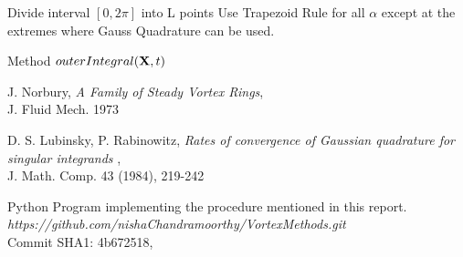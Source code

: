 \documentclass[10pt,a4paper,final]{report}
\begin{document}
\begin{algorithm}
\DontPrintSemicolon
\LinesNumbered
{}
Divide interval $[0,2\pi]$ into L points \;
Use Trapezoid Rule for all $\alpha$ except at the extremes where Gauss Quadrature can be used. \;

\caption{Method $outerIntegral({\bf X},t)$}
\end{algorithm}



\begin{thebibliography}{9}

 J. Norbury,
\emph{A Family of Steady Vortex Rings},\\
J. Fluid Mech. 1973

 D. S. Lubinsky, P. Rabinowitz,
\emph{Rates of convergence of Gaussian quadrature for singular integrands} ,\\ 
J. Math. Comp. 43 (1984), 219-242 

Python Program implementing the procedure mentioned in this report.
\emph{https://github.com/nishaChandramoorthy/VortexMethods.git} \\
Commit SHA1: 4b672518, \\


\end{thebibliography}
\end{document}
